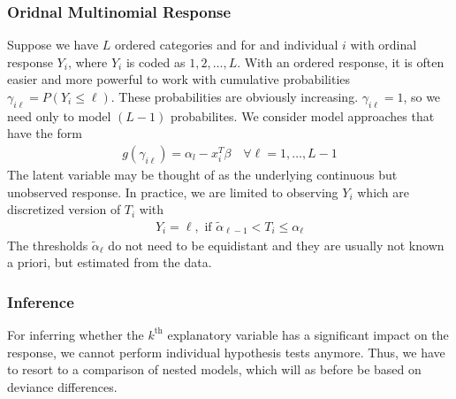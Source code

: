 \subsubsection{Oridnal Multinomial Response}
Suppose we have $L$ ordered categories and
for and individual $i$ with ordinal response $Y_i$,
where $Y_i$ is coded as $1,2,\ldots,L$.
With an ordered response,
it is often easier and more powerful to work with cumulative probabilities
$\gamma_{i\ell} = P(Y_i \leq \ell)$.
These probabilities are obviously increasing.
$\gamma_{i\ell}=1$, so we need only to model $(L-1)$ probabilites.
We consider model approaches that have the form
\begin{align*}
g(\gamma_{i\ell})
=
\alpha_l - x_i^T \beta
\quad
\forall \ell=1,\ldots,L-1
\end{align*}
The latent variable may be thought of as the underlying continuous but
unobserved response.
In practice, we are limited to observing $Y_i$ which are discretized version of
$T_i$ with
\begin{align*}
Y_i = \ell,
\text{ if }
\widetilde{\alpha}_{\ell-1} < T_i \leq \alpha_\ell
\end{align*}
The thresholds $\widetilde\alpha_\ell$ do not need to be equidistant and
they are usually not known a priori,
but estimated from the data.

\subsubsection{Inference}
For inferring whether the $k^\text{th}$ explanatory variable
has a significant impact on the response,
we cannot perform individual hypothesis tests anymore.
Thus, we have to resort to a comparison of nested models,
which will as before be based on deviance differences.